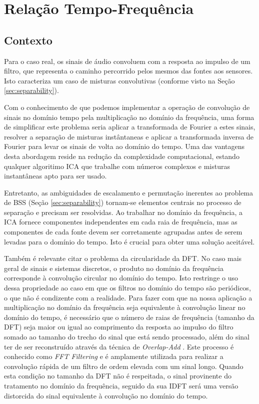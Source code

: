 \label{chap:3}

\section{Relação Tempo-Frequência}
    
    \subsection{Contexto}
        Para o caso real, os sinais de áudio convoluem com a resposta ao impulso de um filtro, que representa o caminho percorrido pelos mesmos das fontes aos sensores. Isto caracteriza um caso de misturas convolutivas (conforme visto na Seção \ref{sec:separability}). 
        
        Com o conhecimento de que podemos implementar a operação de convolução de sinais no domínio tempo pela  multiplicação no domínio da frequência, uma forma de simplificar este problema seria aplicar a transformada de Fourier a estes sinais, resolver a separação de misturas instântaneas e aplicar a transformada inversa de Fourier para levar os sinais de volta ao domínio do tempo. Uma das vantagens desta abordagem reside na redução da complexidade computacional, estando qualquer algoritimo ICA que trabalhe com números complexos e misturas instantâneas apto para ser usado.
        
        Entretanto, as ambiguidades de escalamento e permutação inerentes ao problema de BSS (Seção \ref{sec:separability}) tornam-se elementos centrais no processo de separação e precisam ser resolvidas. Ao trabalhar no domínio da frequência, a ICA fornece componentes independentes em cada raia de frequência, mas as componentes de cada fonte devem ser corretamente agrupadas antes de serem levadas para o domínio do tempo. Isto é crucial para obter uma solução aceitável.
        
        Também é relevante citar o problema da circularidade da DFT. No caso mais geral de sinais e sistemas discretos, o produto no domínio da frequência corresponde à convolução circular no domínio do tempo. Isto restringe o uso dessa propriedade ao caso em que os filtros no domínio do tempo são periódicos, o que não é condizente com a realidade. Para fazer com que na nossa aplicação a multiplicação no domínio da frequência seja equivalente à convolução linear no domínio do tempo, é necessário que o número de raias de frequência (tamanho da DFT) seja maior ou igual ao comprimento da resposta ao impulso do filtro somado ao tamanho do trecho do sinal que está sendo processado, além do sinal ter de ser reconstruído através da técnica de \textit{Overlap-Add} \cite{signalprocessing} . Este processo é conhecido como \textit{FFT Filtering} e é amplamente utilizada para realizar a convolução rápida de um filtro de ordem elevada com um sinal longo. Quando esta condição no tamanho da DFT não é respeitada, o sinal provinente do tratamento no domínio da frequência, seguido da sua IDFT será uma versão distorcida do sinal equivalente à convolução no domínio do tempo.
        
